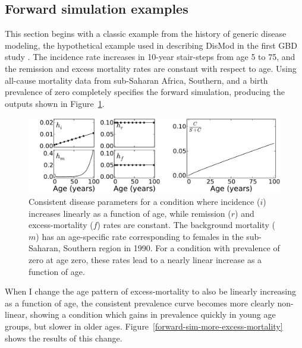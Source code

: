 \subsection{Forward simulation examples}

This section begins with a classic example from the history of generic disease modeling, the hypothetical example used in describing DisMod in the first GBD study \cite{harvard_school_of_public_health.;world_health_organization.;world_bank._global_1996} . The incidence rate increases in 10-year stair-steps from age 5 to 75, and the remission and excess mortality rates are constant with respect to age.  Using all-cause mortality data from sub-Saharan Africa, Southern, and a birth prevalence of zero completely specifies the forward simulation, producing the outputs shown in Figure~\ref{forward-sim-ex1}.

\begin{figure}[h]
\begin{center}
\includegraphics[width=\textwidth]{initial.pdf}
\caption{Consistent disease parameters for a condition where incidence ($i$) increases linearly as a function of age, while remission ($r$) and excess-mortality ($f$) rates are constant. The background mortality ($m$) has an age-specific rate corresponding to females in the sub-Saharan, Southern region in 1990. For a condition with prevalence of zero at age zero, these rates lead to a nearly linear increase as a function of age.}
\label{forward-sim-ex1}
\end{center}
\end{figure}

When I change the age pattern of excess-mortality to also be linearly increasing as a function of age, the consistent prevalence curve becomes more clearly non-linear, showing a condition which gains in prevalence quickly in young age groups, but slower in older ages. Figure~\ref{forward-sim-more-excess-mortality} shows the results of this change.

